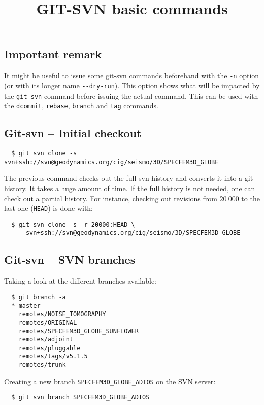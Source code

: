 \documentclass[11pt,twoside]{article}
\begin{document}
\title{GIT-SVN basic commands}
\maketitle

\subsection*{Important remark}

It might be useful to issue some git-svn commands beforehand with the \verb|-n| option (or with its longer name \verb|--dry-run|).
This option shows what will be impacted by the \texttt{git-svn} command before issuing the actual command.
This can be used with the \texttt{dcommit}, \texttt{rebase}, \texttt{branch} and \texttt{tag} commands.

\subsection*{Git-svn -- Initial checkout}
\begin{verbatim}
  $ git svn clone -s svn+ssh://svn@geodynamics.org/cig/seismo/3D/SPECFEM3D_GLOBE
\end{verbatim}
The previous command checks out the full svn history and converts it into a git history. It takes a huge amount of time. If the full history is not needed, one can check out a partial history.
For instance, checking out revisions from $20\:000$ to the last one (\texttt{HEAD}) is done with:
\begin{verbatim}
  $ git svn clone -s -r 20000:HEAD \
      svn+ssh://svn@geodynamics.org/cig/seismo/3D/SPECFEM3D_GLOBE
\end{verbatim}

\subsection*{Git-svn -- SVN branches}

Taking a look at the different branches available:
\begin{verbatim}
  $ git branch -a
  * master
    remotes/NOISE_TOMOGRAPHY
    remotes/ORIGINAL
    remotes/SPECFEM3D_GLOBE_SUNFLOWER
    remotes/adjoint
    remotes/pluggable
    remotes/tags/v5.1.5
    remotes/trunk
\end{verbatim}

Creating a new branch \texttt{SPECFEM3D\_GLOBE\_ADIOS} on the SVN server:
\begin{verbatim}
  $ git svn branch SPECFEM3D_GLOBE_ADIOS
\end{verbatim}
\end{document}

